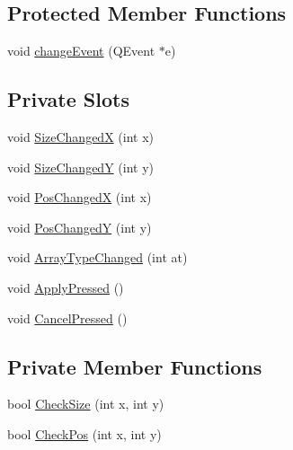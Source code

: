\subsection*{Protected Member Functions}
\begin{DoxyCompactItemize}
\item 
void \hyperlink{classCWidgetOutput_adc2fe6c29b5efecb84cbd9a2c854a8ae}{changeEvent} (QEvent $\ast$e)
\end{DoxyCompactItemize}
\subsection*{Private Slots}
\begin{DoxyCompactItemize}
\item 
void \hyperlink{classCWidgetOutput_a9f9f4aec6fc63607de96aacd44d69d44}{SizeChangedX} (int x)
\item 
void \hyperlink{classCWidgetOutput_ad71a09c6e75893732ab306ebf235ae3f}{SizeChangedY} (int y)
\item 
void \hyperlink{classCWidgetOutput_a49bf6287bc7ec9eb962cf22d261f0110}{PosChangedX} (int x)
\item 
void \hyperlink{classCWidgetOutput_a41c2d7f5f4dac75a4d41bf9ca807d838}{PosChangedY} (int y)
\item 
void \hyperlink{classCWidgetOutput_ab16e835c4cfa86cc10db87d3d7a4049b}{ArrayTypeChanged} (int at)
\item 
void \hyperlink{classCWidgetOutput_a85f2e81ad45e331d0a37d5d7e11a4b53}{ApplyPressed} ()
\item 
void \hyperlink{classCWidgetOutput_a8d34da834418a33f61ad02a7559ab6e4}{CancelPressed} ()
\end{DoxyCompactItemize}
\subsection*{Private Member Functions}
\begin{DoxyCompactItemize}
\item 
bool \hyperlink{classCWidgetOutput_a118825abe1b61b854786bf899df97903}{CheckSize} (int x, int y)
\item 
bool \hyperlink{classCWidgetOutput_aee8224c38a13ee5bc2badcbfae43a4b0}{CheckPos} (int x, int y)
\end{DoxyCompactItemize}
